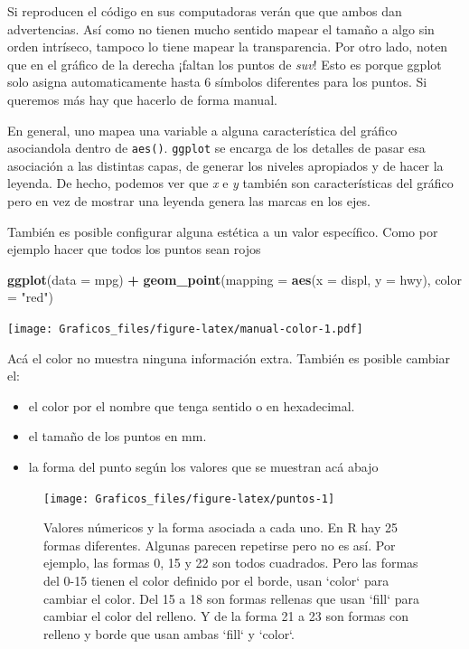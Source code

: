 \documentclass[]{book}
\newenvironment{Shaded}{\begin{snugshade}}{\end{snugshade}}
\newcommand{\DataTypeTok}[1]{\textcolor[rgb]{0.13,0.29,0.53}{#1}}
\newcommand{\KeywordTok}[1]{\textcolor[rgb]{0.13,0.29,0.53}{\textbf{#1}}}
\newcommand{\NormalTok}[1]{#1}
\newcommand{\OperatorTok}[1]{\textcolor[rgb]{0.81,0.36,0.00}{\textbf{#1}}}
\newcommand{\StringTok}[1]{\textcolor[rgb]{0.31,0.60,0.02}{#1}}
\providecommand{\tightlist}{%
  \setlength{\itemsep}{0pt}\setlength{\parskip}{0pt}}
\theoremstyle{definition}
\theoremstyle{definition}
\theoremstyle{definition}
\theoremstyle{remark}
\begin{document}
Si reproducen el código en sus computadoras verán que que ambos dan
advertencias. Así como no tienen mucho sentido mapear el tamaño a algo
sin orden intríseco, tampoco lo tiene mapear la transparencia. Por otro
lado, noten que en el gráfico de la derecha ¡faltan los puntos de
\emph{suv}! Esto es porque ggplot solo asigna automaticamente hasta 6
símbolos diferentes para los puntos. Si queremos más hay que hacerlo de
forma manual.

En general, uno mapea una variable a alguna característica del gráfico
asociandola dentro de \texttt{aes()}. \texttt{ggplot} se encarga de los
detalles de pasar esa asociación a las distintas capas, de generar los
niveles apropiados y de hacer la leyenda. De hecho, podemos ver que
\emph{x} e \emph{y} también son características del gráfico pero en vez
de mostrar una leyenda genera las marcas en los ejes.

También es posible configurar alguna estética a un valor específico.
Como por ejemplo hacer que todos los puntos sean rojos

\begin{Shaded}
\begin{Highlighting}[]
\KeywordTok{ggplot}\NormalTok{(}\DataTypeTok{data =}\NormalTok{ mpg) }\OperatorTok{+}\StringTok{ }
\StringTok{  }\KeywordTok{geom_point}\NormalTok{(}\DataTypeTok{mapping =} \KeywordTok{aes}\NormalTok{(}\DataTypeTok{x =}\NormalTok{ displ, }\DataTypeTok{y =}\NormalTok{ hwy), }\DataTypeTok{color =} \StringTok{"red"}\NormalTok{)}
\end{Highlighting}
\end{Shaded}

\texttt{[image: Graficos\_files/figure-latex/manual-color-1.pdf]}

Acá el color no muestra ninguna información extra. También es posible
cambiar el:

\begin{itemize}
\tightlist
\item
  el color por el nombre que tenga sentido o en hexadecimal.
\item
  el tamaño de los puntos en mm.
\item
  la forma del punto según los valores que se muestran acá abajo
\end{itemize}

\begin{figure}
\texttt{[image: Graficos\_files/figure-latex/puntos-1]} \caption{Valores númericos y la forma asociada a cada uno. En R hay 25 formas diferentes. Algunas parecen repetirse pero no es así. Por ejemplo, las formas 0, 15 y 22 son todos cuadrados. Pero las formas del 0-15 tienen el color definido por el borde, usan `color` para cambiar el color. Del 15 a 18 son formas rellenas que usan `fill` para cambiar el color del relleno. Y de la forma 21 a 23 son formas con relleno y borde que usan ambas `fill` y `color`.}\label{fig:puntos}
\end{figure}
\end{document}
